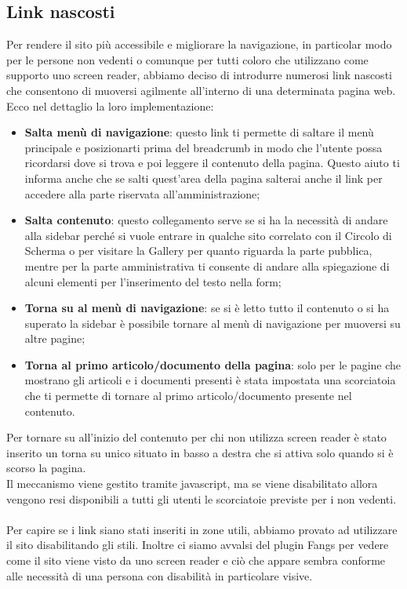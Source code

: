 \subsection{Link nascosti}
Per rendere il sito pi\`u accessibile e migliorare la navigazione, in particolar modo per le persone non vedenti o comunque per tutti coloro che utilizzano come supporto uno screen reader, abbiamo deciso di introdurre numerosi link nascosti che consentono di muoversi agilmente all'interno di una determinata pagina web. \\
Ecco nel dettaglio la loro implementazione:
	\begin{itemize}
		\item \textbf{Salta men\`u di navigazione}: questo link ti permette di saltare il men\`u principale e posizionarti prima del breadcrumb in modo che l'utente possa ricordarsi dove si trova e poi leggere il contenuto della pagina. Questo aiuto ti informa anche che se salti quest'area della pagina salterai anche il link per accedere alla parte riservata all'amministrazione;
		\item \textbf{Salta contenuto}: questo collegamento serve se si ha la necessit\`a di andare alla sidebar perch\'e si vuole entrare in qualche sito correlato con il Circolo di Scherma o per visitare la Gallery per quanto riguarda la parte pubblica, mentre per la parte amministrativa ti consente di andare alla spiegazione di alcuni elementi per l'inserimento del testo nella form;
		\item \textbf{Torna su al men\`u di navigazione}: se si \`e letto tutto il contenuto o si ha superato la sidebar \`e possibile tornare al men\`u di navigazione per muoversi su altre pagine;
		\item \textbf{Torna al primo articolo/documento della pagina}: solo per le pagine che mostrano gli articoli e i documenti presenti \`e stata impostata una scorciatoia che ti permette di tornare al primo articolo/documento presente nel contenuto.
 
	\end{itemize}
Per tornare su all'inizio del contenuto per chi non utilizza screen reader \`e stato inserito un torna su unico situato in basso a destra che si attiva solo quando si \`e scorso la pagina.
\\ Il meccanismo viene gestito tramite javascript, ma se viene disabilitato allora vengono resi disponibili a tutti gli utenti le scorciatoie previste per i non vedenti. \\
\\ Per capire se i link siano stati inseriti in zone utili, abbiamo provato ad utilizzare il sito disabilitando gli stili. Inoltre ci siamo avvalsi del plugin Fangs per vedere come il sito viene visto da uno screen reader e ci\`o che appare sembra conforme alle necessit\`a di una persona con disabilit\`a in particolare visive.
